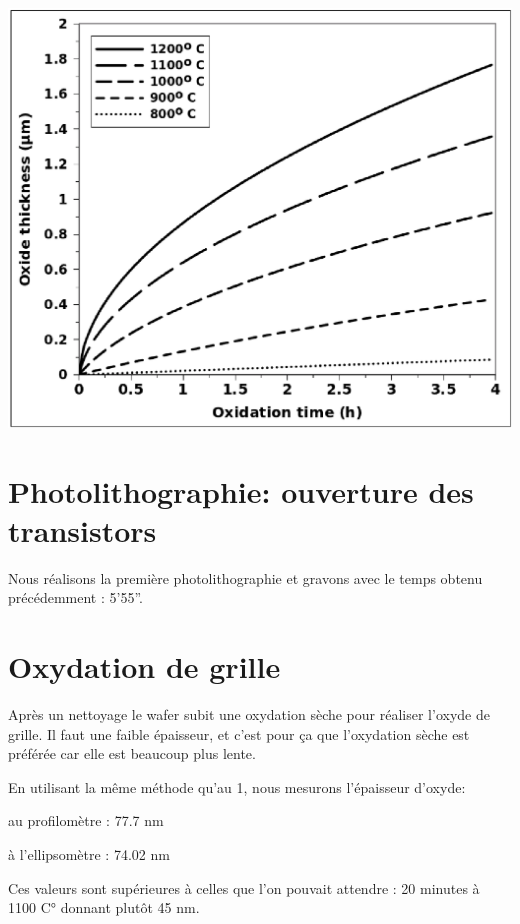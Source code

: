 \documentclass{article}
\begin{document}
\includegraphics[width=\linewidth]{img160.png}

\section{Photolithographie: ouverture des transistors}

Nous réalisons la première photolithographie et gravons avec le temps obtenu précédemment : 5’55”.

\section{Oxydation de grille}

Après un nettoyage le wafer subit une oxydation sèche pour réaliser l’oxyde de grille. Il faut une faible épaisseur, et c’est pour ça que l’oxydation sèche est préférée car elle est beaucoup plus lente.

En utilisant la même méthode qu’au 1, nous mesurons l’épaisseur d’oxyde:


au profilomètre : 77.7 nm

à l’ellipsomètre : 74.02 nm

Ces valeurs sont supérieures à celles que l’on pouvait attendre : 20 minutes à 1100 C° donnant plutôt 45 nm.
\end{document}
